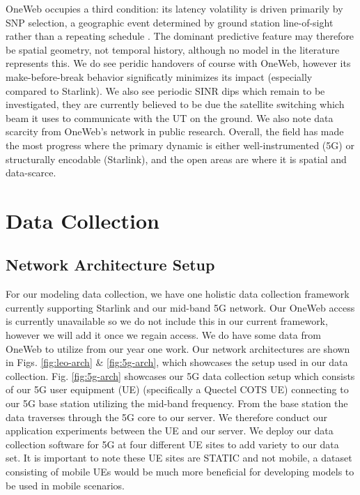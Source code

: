 \documentclass[12pt]{article}
\begin{document}
OneWeb occupies a third condition: its latency volatility is driven primarily by SNP selection, a geographic event determined by ground station line-of-sight rather than a repeating schedule \cite{zhao2025measuring, 11310330}. The dominant predictive feature may therefore be spatial geometry, not temporal history, although no model in the literature represents this. We do see peridic handovers of course with OneWeb, however its make-before-break behavior significatly minimizes its impact (especially compared to Starlink). We also see periodic SINR dips which remain to be investigated, they are currently believed to be due the satellite switching which beam it uses to communicate with the UT on the ground. We also note data scarcity from OneWeb's network in public research. Overall, the field has made the most progress where the primary dynamic is either well-instrumented (5G) or structurally encodable (Starlink), and the open areas are where it is spatial and data-scarce.

\section{Data Collection}

\subsection{Network Architecture Setup}

For our modeling data collection, we have one holistic data collection framework currently supporting Starlink and our mid-band 5G network. Our OneWeb access is currently unavailable so we do not include this in our current framework, however we will add it once we regain access. We do have some data from OneWeb to utilize from our year one work. Our network architectures are shown in Figs. \ref{fig:leo-arch} \& \ref{fig:5g-arch}, which showcases the setup used in our data collection. Fig. \ref{fig:5g-arch} showcases our 5G data collection setup which consists of our 5G user equipment (UE) (specifically a Quectel COTS UE) connecting to our 5G base station utilizing the mid-band frequency. From the base station the data traverses through the 5G core to our server. We therefore conduct our application experiments between the UE and our server. We deploy our data collection software for 5G at four different UE sites to add variety to our data set. It is important to note these UE sites are STATIC and not mobile, a dataset consisting of mobile UEs would be much more beneficial for developing models to be used in mobile scenarios.
\end{document}
